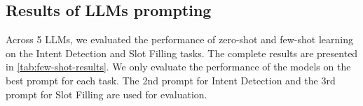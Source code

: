 \subsection{Results of LLMs prompting}
\label{app:llm-few-shot-results}
Across 5 LLMs, we evaluated the performance of zero-shot and few-shot learning on the Intent Detection and Slot Filling tasks. The complete results are presented in \autoref{tab:few-shot-results}. We only evaluate the performance of the models on the best prompt for each task. The 2nd prompt for Intent Detection and the 3rd prompt for Slot Filling are used for evaluation. 

